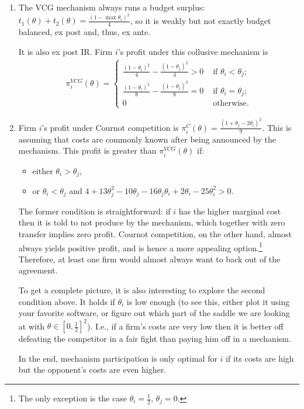 \documentclass[a4paper]{article}
\begin{document}
\begin{enumerate}
	\item The VCG mechanism always runs a budget surplus: $t_1(\theta)+t_2(\theta) = \frac{(1-\max \theta_i)^2}{4}$, so it is weakly but not exactly budget balanced, ex post and, thus, ex ante.
	
	It is also ex post IR. Firm $i$'s profit under this collusive mechanism is
	\begin{align*}
		\pi_i^{VCG}(\theta) =
		\begin{cases}
			\frac{(1-\theta_i)^2}{4} - \frac{(1-\theta_j)^2}{4} >0 & \text{ if } \theta_i < \theta_j;
			\\
			\frac{(1-\theta_i)^2}{8} - \frac{(1-\theta_j)^2}{8} =0 & \text{ if } \theta_i = \theta_j;
			\\
			0 & \text{ otherwise.}
		\end{cases}
	\end{align*}
	
	\item Firm $i$'s profit under Cournot competition is $\pi_i^C (\theta) = \frac{(1 +\theta_j - 2\theta_i)^2}{9}$. This is assuming that costs are commonly known after being announced by the mechanism. This profit is greater than $\pi_i^{VCG}(\theta)$ if:
	\begin{itemize}
		\item either $\theta_i > \theta_j$,
		\item or $\theta_i < \theta_j$ and $4+13\theta_j^2 - 10 \theta_j - 16 \theta_j \theta_i + 2 \theta_i - 25 \theta_i^2 > 0$.
	\end{itemize}
	The former condition is straightforward: if $i$ has the higher marginal cost then it is told to not produce by the mechanism, which together with zero transfer implies zero profit. Cournot competition, on the other hand, almost always yields positive profit, and is hence a more appealing option.\footnote{The only exception is the case $\theta_i=\frac{1}{2}$, $\theta_j = 0$.}
	Therefore, at least one firm would almost always want to back out of the agreement.
	
	To get a complete picture, it is also interesting to explore the second condition above. It holds if $\theta_i$ is low enough (to see this, either plot it using your favorite software, or figure out which part of the saddle we are looking at with $\theta \in [0,\frac{1}{2}]^2$). I.e., if a firm's costs are very low then it is better off defeating the competitor in a fair fight than paying him off in a mechanism. 
	
	In the end, mechanism participation is only optimal for $i$ if its costs are high but the opponent's costs are even higher.
\end{enumerate}
\fi

\end{document}
